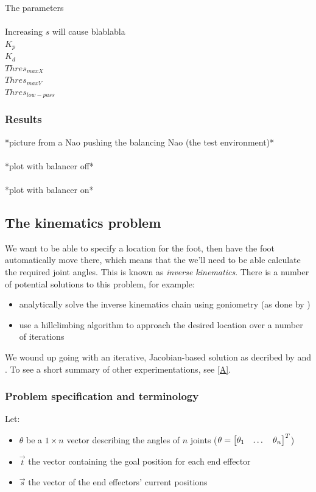 \documentclass[a4paper]{article}
\begin{document}
The parameters\\\\
Increasing $s$ will cause blablabla\\
$K_p$\\
$K_d$\\
$Thres_{max X}$\\
$Thres_{max Y}$\\
$Thres_{low-pass}$

\subsubsection{Results}

*picture from a Nao pushing the balancing Nao (the test environment)*\\\\
*plot with balancer off*\\\\
*plot with balancer on*

\subsection{The kinematics problem}
\label{sec:ik}
We want to be able to specify a location for the foot, then have the foot
automatically move there, which means that the we'll need to be able calculate
the required joint angles. This is known as \emph{inverse kinematics}. There is
a number of potential solutions to this problem, for example: 
\begin{itemize}
\item analytically solve the inverse kinematics chain using goniometry (as done by \cite{Graf2009})
\item use a hillclimbing algorithm to approach the desired location over a number of iterations
\end{itemize}

We wound up going with an iterative, Jacobian-based solution as decribed by
\cite{Meredith2004} and \cite{Buss2009}. To see a short summary of other
experimentations, see \ref{A}.

\subsubsection{Problem specification and terminology}
Let:
\begin{itemize}
    \item $\theta$ be a $1 \times n$ vector describing the angles of $n$ joints
        ($\theta = \begin{bmatrix} \theta_1 & \dots & \theta_n \end{bmatrix}^T$)
    \item $\vec{t}$ the vector containing the goal position for each end effector
    \item $\vec{s}$ the vector of the end effectors' current positions
\end{itemize}
\end{document}

